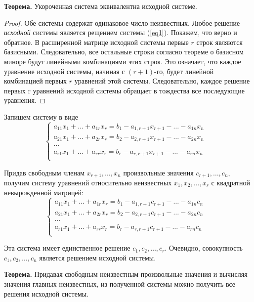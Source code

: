 \textbf{Теорема.} Укороченная система эквивалентна исходной системе.

\begin{proof}
Обе системы содержат одинаковое число неизвестных. Любое решение \textit{исходной} системы является рещением системы (\ref{eq1}). Покажем, что верно и обратное.
В расширенной матрице исходной системы первые $r$ строк являются базисными. Следовательно, все остальные строки согласно теореме о базисном миноре будут линейными комбинациями этих строк. Это означает, что каждое уравнение исходной системы, начиная с $(r+1)$-го, будет линейной комбинацией первых $r$ уравнений этой системы. Следовательно, каждое решение первых r уравнений исходной системы обращает в тождества все последующие уравнения.
\end{proof}

Запишем систему в виде
$$\begin{cases}
        a_{11}x_1+\dots + a_{1r}x_r = b_1-a_{1,r+1}x_{r+1} -\dots-a_{1n}x_n &\\
        a_{21}x_1+\dots + a_{2r}x_r= b_2-a_{2,r+1}x_{r+1} -\dots-a_{2n}x_n&\\
        \dots&\\
        a_{r1}x_1+\dots + a_{rr}x_r= b_r-a_{r,r+1}x_{r+1} -\dots-a_{rn}x_n&\\
    \end{cases}$$

Придав свободным членам $x_{r+1}, \dots, x_n$ произвольные значения $c_{r+1}, \dots, c_n$, получим систему уравнений относительно неизвестных $x_1, x_2, \dots, x_r$ с квадратной невырожденной матрицей:
\begin{equation}
    \begin{cases}
        a_{11}x_1+\dots + a_{1r}x_r = b_1-a_{1,r+1}c_{r+1} -\dots-a_{1n}c_n &\\
        a_{21}x_1+\dots + a_{2r}x_r= b_2-a_{2,r+1}c_{r+1} -\dots-a_{2n}c_n&\\
        \dots&\\
        a_{r1}x_1+\dots + a_{rr}x_r= b_r-a_{r,r+1}c_{r+1} -\dots-a_{rn}c_n&\\
    \end{cases}
    \label{eq2}
\end{equation}

Эта система имеет единственное решение $c_1, c_2, \dots, c_r$. Очевидно, совокупность $c_1, c_2, \dots, c_n$ является решением исходной системы.

\textbf{Теорема.} Придавая свободным неизвестным произвольные значения и вычисляя значения главных неизвестных, из полученной системы можно получить все решения исходной системы.

